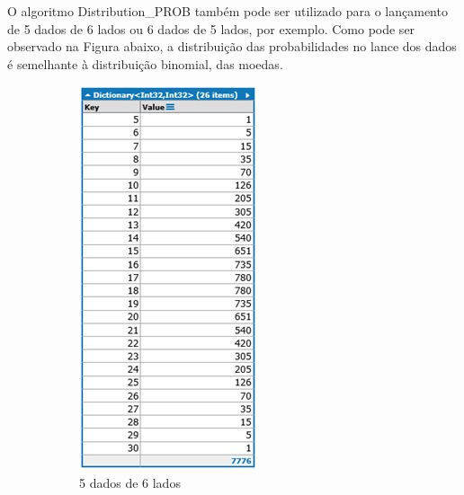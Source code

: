 \begin{apendicesenv}
O algoritmo Distribution\_PROB também pode ser utilizado para o lançamento de 5 dados de 6 lados ou 6 dados de 5 lados, por exemplo. Como pode ser observado na Figura abaixo, a distribuição das probabilidades no lance dos dados é semelhante à distribuição binomial, das moedas.
\begin{figure}[H]
\centering
	\begin{subfigure}[H]{0.47\linewidth}
	\centering
	\includegraphics[width=.6\linewidth]{sections/images/Distribution_PROB_5_6.jpg}
	\caption{5 dados de 6 lados}
	\label{fig:Distribution_PROB_5_6}
	\end{subfigure}
\hfill
	\begin{subfigure}[H]{0.47\linewidth}
	\centering

\end{subfigure}
\end{figure}
\end{apendicesenv}

